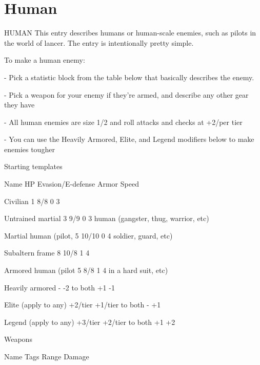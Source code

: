 \section{Human}
                                                HUMAN
This entry describes humans or human-scale enemies, such as pilots in the world of lancer. The
entry is intentionally pretty simple.


To make a human enemy:

            -   Pick a statistic block from the table below that basically describes the enemy.

            -   Pick a weapon for your enemy if they’re armed, and describe any other gear they
                have

            -   All human enemies are size 1/2 and roll attacks and checks at +2/per tier

            -   You can use the Heavily Armored, Elite, and Legend modifiers below to make
                enemies tougher


                                           Starting templates

 Name                        HP         Evasion/E-defense            Armor                   Speed

 Civilian                    1          8/8                          0                       3

 Untrained martial           3          9/9                          0                       3
 human (gangster, thug,
 warrior, etc)

 Martial human (pilot,       5          10/10                        0                       4
 soldier, guard, etc)

 Subaltern frame             8          10/8                         1                       4

 Armored human (pilot        5          8/8                          1                       4
 in a hard suit, etc)

 Heavily armored             -          -2 to both                   +1                      -1

 Elite (apply to any)        +2/tier    +1/tier to both              -                       +1

 Legend (apply to any)       +3/tier    +2/tier to both              +1                      +2

                                                Weapons

 Name                        Tags                          Range                    Damage

